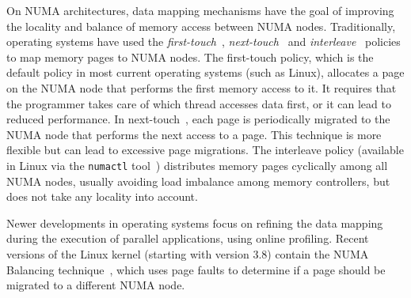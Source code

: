 
On NUMA architectures, data mapping mechanisms have the goal of improving the locality and balance of memory access between NUMA nodes.
Traditionally, operating systems have used the \emph{first-touch}~\cite{Marchetti1995}, \emph{next-touch}~\cite{Lof2005} and \emph{interleave}~\cite{Kleen2004} policies to map memory pages to NUMA nodes.
The first-touch policy, which is the default policy in most current operating systems (such as Linux), allocates a page on the NUMA node that performs the first memory access to it.
It requires that the programmer takes care of which thread accesses data
first, or it can lead to reduced performance.
In next-touch~\cite{Lof2005}, each page is periodically migrated to the NUMA
node that performs the next access to a page. This technique is more flexible
but can lead to excessive page migrations.
The interleave policy (available in Linux via the \texttt{numactl}
tool~\cite{Kleen2004}) distributes memory pages cyclically among all NUMA nodes,
usually avoiding load imbalance among memory controllers, but does not take any locality into account.

Newer developments in operating systems focus on refining the data mapping during the execution of parallel applications, using online profiling.
Recent versions of the Linux kernel (starting with version 3.8) contain the
NUMA Balancing technique~\cite{Corbet}, which uses page faults to determine if
a page should be migrated to a different NUMA node.%

